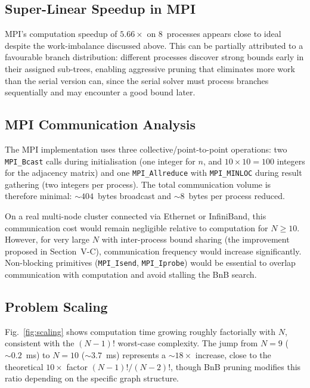 \documentclass[conference]{IEEEtran}
\begin{document}
\subsection{Super-Linear Speedup in MPI}

MPI's computation speedup of $5.66\times$ on 8~processes appears
close to ideal despite the work-imbalance discussed above. This can be
partially attributed to a favourable branch distribution: different processes
discover strong bounds early in their assigned sub-trees, enabling aggressive
pruning that eliminates more work than the serial version can, since the serial
solver must process branches sequentially and may encounter a good bound later.

\subsection{MPI Communication Analysis}

The MPI implementation uses three collective/point-to-point operations:
two \texttt{MPI\_Bcast} calls during initialisation (one integer for $n$,
and $10 \times 10 = 100$ integers for the adjacency matrix) and one
\texttt{MPI\_Allreduce} with \texttt{MPI\_MINLOC} during result gathering
(two integers per process). The total communication volume is therefore
minimal: ${\sim}404$~bytes broadcast and ${\sim}8$~bytes per process
reduced.

On a real multi-node cluster connected via Ethernet or InfiniBand, this
communication cost would remain negligible relative to computation for
$N \geq 10$. However, for very large $N$ with inter-process bound sharing
(the improvement proposed in Section~V-C), communication frequency would
increase significantly. Non-blocking primitives (\texttt{MPI\_Isend},
\texttt{MPI\_Iprobe}) would be essential to overlap communication with
computation and avoid stalling the BnB search.

\subsection{Problem Scaling}

Fig.~\ref{fig:scaling} shows computation time growing roughly factorially with
$N$, consistent with the $(N{-}1)!$ worst-case complexity. The jump from
$N{=}9$ (${\sim}0.2$~ms) to $N{=}10$ (${\sim}3.7$~ms) represents a
${\sim}18\times$ increase, close to the theoretical $10\times$ factor
$(N{-}1)!/(N{-}2)!$, though BnB pruning modifies this ratio depending on
the specific graph structure.
\end{document}
